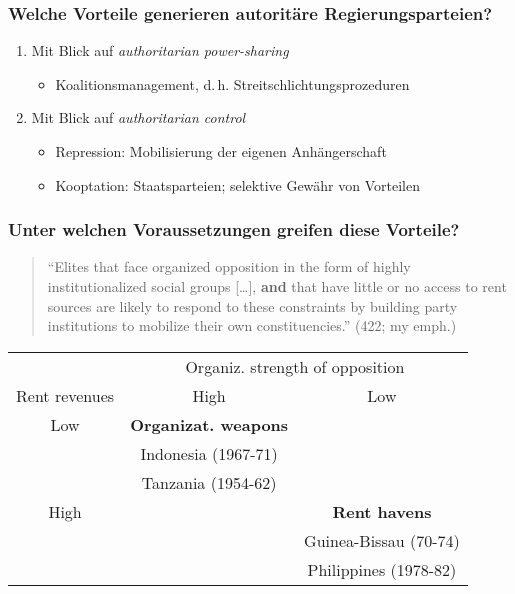 \documentclass{beamer}
\begin{document}
\begin{frame}
  \frametitle{Welche Vorteile generieren autoritäre Regierungsparteien?}
  \begin{enumerate}
    \item Mit Blick auf \textit{authoritarian power-sharing}
    \begin{itemize}
      \item Koalitionsmanagement, d.\,h. Streitschlichtungsprozeduren
    \end{itemize}
    \item Mit Blick auf \textit{authoritarian control}
    \begin{itemize}
      \item Repression: Mobilisierung der eigenen Anhängerschaft
      \item Kooptation: Staatsparteien; selektive Gewähr von Vorteilen
    \end{itemize}
  \end{enumerate}
\end{frame}

\begin{frame}
  \frametitle{Unter welchen Voraussetzungen greifen diese Vorteile?}
  \begin{quote}
  ``Elites that face organized opposition in the form of
  highly institutionalized social groups [\dots], \textbf{and}
  that have little or no access to rent sources are
  likely to respond to these constraints
  by building party institutions to mobilize their own
  constituencies.'' (422; my emph.)
\end{quote}
\begin{tabular}{*{3}{c}}
~ & \multicolumn{2}{c}{Organiz. strength of opposition} \\
Rent revenues & High & Low \\ \midrule
Low &  \textbf{Organizat. weapons} \\
~ & Indonesia (1967-71) \\
~ & Tanzania (1954-62) \\
High & ~ & \textbf{Rent havens} \\
~ & ~ & Guinea-Bissau (70-74) \\
~ & ~ & Philippines (1978-82) \\
\end{tabular}
\end{frame}
\end{document}
